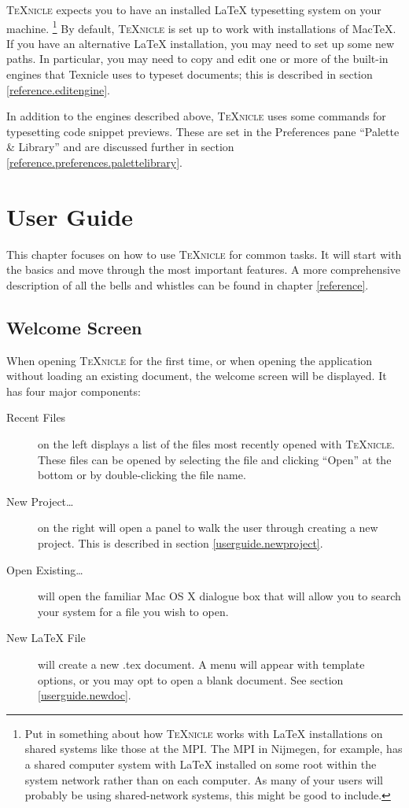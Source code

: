 \documentclass[11pt]{report}
\newcommand{\texnicle}{\textsc{TeXnicle}\xspace}
\begin{document}
\texnicle expects you to have an installed {\LaTeX} typesetting system on your machine. \footnote{Put in something about how \texnicle works with {\LaTeX} installations on shared systems like those at the MPI. The MPI in Nijmegen, for example, has a shared computer system with {\LaTeX} installed on some root within the system network rather than on each computer. As many of your users will probably be using shared-network systems, this might be good to include.} By default, \texnicle is set up to work with installations of MacTeX. If you have an alternative {\LaTeX} installation, you may need to set up some new paths. In particular, you may need to copy and edit one or more of the built-in engines that Texnicle uses to typeset documents; this is described in section \ref{reference.editengine}.

In addition to the engines described above, \texnicle uses some commands for typesetting code snippet previews. These are set in the Preferences pane ``Palette \& Library'' and are discussed further in section \ref{reference.preferences.palettelibrary}.

\chapter{User Guide}
\label{userguide}
This chapter focuses on how to use \texnicle for common tasks. It will start with the basics and move through the most important features. A more comprehensive description of all the bells and whistles can be found in chapter \ref{reference}.

\section{Welcome Screen}
\label{userguide.welcome}
When opening \texnicle for the first time, or when opening the application without loading an existing document, the welcome screen will be displayed. It has four major components:
	\begin{description}
		\item[Recent Files] on the left displays a list of the files most recently opened with \texnicle. These files can be opened by selecting the file and clicking ``Open'' at the bottom or by double-clicking the file name.
		\item[New Project\ldots] on the right will open a panel to walk the user through creating a new project. This is described in section \ref{userguide.newproject}.
		\item[Open Existing\ldots] will open the familiar Mac OS X dialogue box that will allow you to search your system for a file you wish to open.
		\item[New {\LaTeX} File] will create a new {}.tex document. A menu will appear with template options, or you may opt to open a blank document. See section \ref{userguide.newdoc}.
	\end{description}
	
\end{document}
